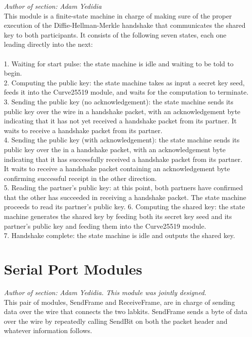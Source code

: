 \documentclass[a4paper]{report}
\begin{document}
\emph{Author of section: Adam Yedidia} \\

This module is a finite-state machine in charge of making sure of the proper execution of the Diffie-Hellman-Merkle handshake that communicates the shared key to both participants. It consists of the following seven states, each one leading directly into the next: \\ \\
1. Waiting for start pulse: the state machine is idle and waiting to be told to begin. \\
2. Computing the public key: the state machine takes as input a secret key seed, feeds it into the Curve25519 module, and waits for the computation to terminate. \\
3. Sending the public key (no acknowledgement): the state machine sends its public key over the wire in a handshake packet, with an acknowledgement byte indicating that it has not yet received a handshake packet from its partner. It waits to receive a handshake packet from its partner. \\
4. Sending the public key (with acknowledgement): the state machine sends its public key over the in a handshake packet, with an acknowledgement byte indicating that it has successfully received a handshake packet from its partner. It waits to receive a handshake packet containing an acknowledgement byte confirming successful receipt in the other direction. \\
5. Reading the partner's public key: at this point, both partners have confirmed that the other has succeeded in receiving a handshake packet. The state machine proceeds to read its partner's public key. 
6. Computing the shared key: the state machine generates the shared key by feeding both its secret key seed and its partner's public key and feeding them into the Curve25519 module. \\
7. Handshake complete: the state machine is idle and outputs the shared key. \\

\section{Serial Port Modules}

\emph{Author of section: Adam Yedidia. This module was jointly designed.} \\

This pair of modules, SendFrame and ReceiveFrame, are in charge of sending data over the wire that connects the two labkits. SendFrame sends a byte of data over the wire by repeatedly calling SendBit on both the packet header and whatever information follows. \\
\end{document}
